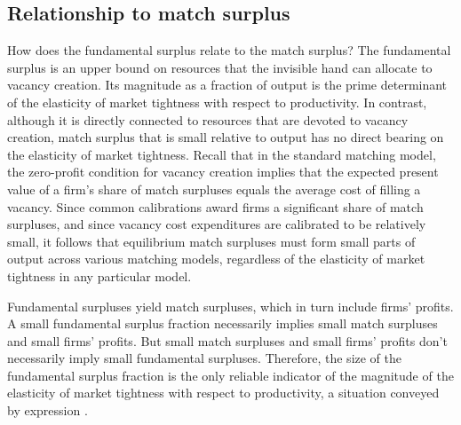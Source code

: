 \subsection{Relationship to match surplus}
How does the fundamental surplus relate to the match surplus?
The fundamental
surplus is an upper bound on resources that the invisible hand
can allocate to vacancy creation.  Its magnitude as a
fraction of output is the prime determinant of the
elasticity of market tightness with respect to productivity.
In contrast, although it
is directly connected to resources that are
devoted to vacancy creation,  match surplus that is small
relative to output
has no direct bearing on the elasticity of market tightness.
Recall that in the standard matching model, the zero-profit
condition for vacancy creation implies that the expected present
value of a firm's share of match surpluses  equals
the average cost of filling a vacancy. Since common
calibrations award firms a significant share of
match surpluses,  and since vacancy cost expenditures are calibrated
to be relatively small,
it follows that
equilibrium match surpluses must form  small parts of output
across various matching models, regardless of the elasticity
of market tightness in any particular model.

Fundamental surpluses yield match surpluses, which in turn include
firms' profits.
A small fundamental surplus
fraction necessarily implies small match surpluses and small firms' profits.
But small match surpluses and small firms' profits don't necessarily  imply
small fundamental surpluses. Therefore,   the size of the fundamental surplus fraction
is the only reliable indicator
of  the magnitude
of the elasticity of market tightness with respect to productivity, a situation  conveyed by expression .






